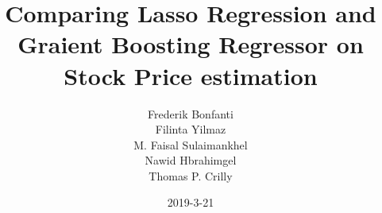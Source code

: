 \documentclass[a4paper]{article}
\title{Comparing Lasso Regression and Graient Boosting Regressor on Stock Price estimation}
\date{2019-3-21}
\author{Frederik Bonfanti \\ Filinta Yilmaz \\ M. Faisal Sulaimankhel \\ Nawid Hbrahimgel \\ Thomas P. Crilly}
\begin{document}
\maketitle






{}

\end{document}

